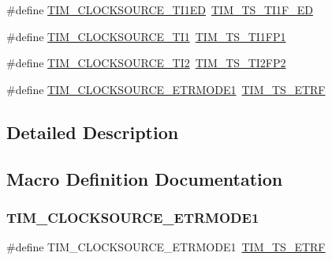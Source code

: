 \begin{DoxyCompactItemize}
\item 
\#define \mbox{\hyperlink{group___t_i_m___clock___source_gad8c96337acf40356d82570cc4851ce2d}{T\+I\+M\+\_\+\+C\+L\+O\+C\+K\+S\+O\+U\+R\+C\+E\+\_\+\+T\+I1\+ED}}~\mbox{\hyperlink{group___t_i_m___trigger___selection_ga8c89554efc693e679c94b5a749af123c}{T\+I\+M\+\_\+\+T\+S\+\_\+\+T\+I1\+F\+\_\+\+ED}}
\item 
\#define \mbox{\hyperlink{group___t_i_m___clock___source_ga0a8708d4dab5cbd557a76efb362e13c0}{T\+I\+M\+\_\+\+C\+L\+O\+C\+K\+S\+O\+U\+R\+C\+E\+\_\+\+T\+I1}}~\mbox{\hyperlink{group___t_i_m___trigger___selection_ga38d3514d54bcdb0ea8ac8bd91c5832b5}{T\+I\+M\+\_\+\+T\+S\+\_\+\+T\+I1\+F\+P1}}
\item 
\#define \mbox{\hyperlink{group___t_i_m___clock___source_ga7950cf616702dd38d8f1ab5091efc012}{T\+I\+M\+\_\+\+C\+L\+O\+C\+K\+S\+O\+U\+R\+C\+E\+\_\+\+T\+I2}}~\mbox{\hyperlink{group___t_i_m___trigger___selection_ga0ed58a269bccd3f22d19cc9a2ba3123f}{T\+I\+M\+\_\+\+T\+S\+\_\+\+T\+I2\+F\+P2}}
\item 
\#define \mbox{\hyperlink{group___t_i_m___clock___source_gaa7743af6f4b8869cad0375526c6145ce}{T\+I\+M\+\_\+\+C\+L\+O\+C\+K\+S\+O\+U\+R\+C\+E\+\_\+\+E\+T\+R\+M\+O\+D\+E1}}~\mbox{\hyperlink{group___t_i_m___trigger___selection_gaece08e02e056613a882aa7ff0a6ccc2d}{T\+I\+M\+\_\+\+T\+S\+\_\+\+E\+T\+RF}}
\end{DoxyCompactItemize}


\subsection{Detailed Description}


\subsection{Macro Definition Documentation}
\mbox{\label{group___t_i_m___clock___source_gaa7743af6f4b8869cad0375526c6145ce}} 
\subsubsection{\texorpdfstring{TIM\_CLOCKSOURCE\_ETRMODE1}{TIM\_CLOCKSOURCE\_ETRMODE1}}
{\footnotesize\ttfamily \#define T\+I\+M\+\_\+\+C\+L\+O\+C\+K\+S\+O\+U\+R\+C\+E\+\_\+\+E\+T\+R\+M\+O\+D\+E1~\mbox{\hyperlink{group___t_i_m___trigger___selection_gaece08e02e056613a882aa7ff0a6ccc2d}{T\+I\+M\+\_\+\+T\+S\+\_\+\+E\+T\+RF}}}

